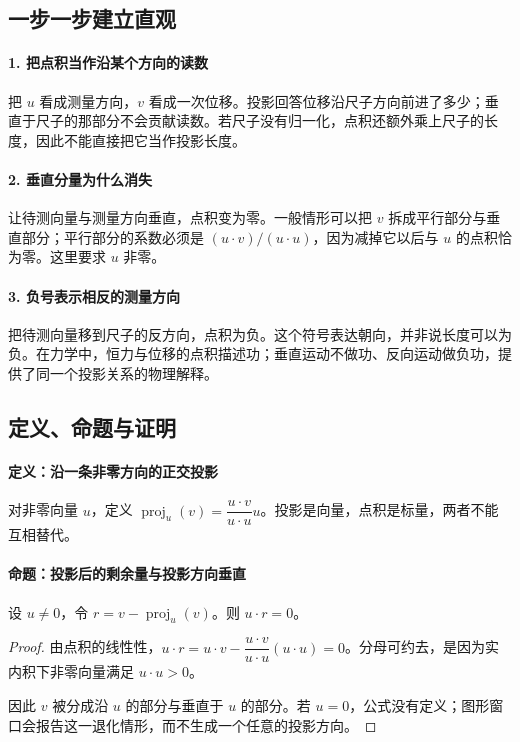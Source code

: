 \subsection*{一步一步建立直观}

\paragraph{1. 把点积当作沿某个方向的读数}

把 $u$ 看成测量方向，$v$ 看成一次位移。投影回答位移沿尺子方向前进了多少；垂直于尺子的那部分不会贡献读数。若尺子没有归一化，点积还额外乘上尺子的长度，因此不能直接把它当作投影长度。



\paragraph{2. 垂直分量为什么消失}

让待测向量与测量方向垂直，点积变为零。一般情形可以把 $v$ 拆成平行部分与垂直部分；平行部分的系数必须是 $(u\cdot v)/(u\cdot u)$，因为减掉它以后与 $u$ 的点积恰为零。这里要求 $u$ 非零。



\paragraph{3. 负号表示相反的测量方向}

把待测向量移到尺子的反方向，点积为负。这个符号表达朝向，并非说长度可以为负。在力学中，恒力与位移的点积描述功；垂直运动不做功、反向运动做负功，提供了同一个投影关系的物理解释。



\subsection*{定义、命题与证明}

\paragraph{定义：沿一条非零方向的正交投影}

对非零向量 $u$，定义 $\operatorname{proj}_u(v)=\dfrac{u\cdot v}{u\cdot u}u$。投影是向量，点积是标量，两者不能互相替代。

\paragraph{命题：投影后的剩余量与投影方向垂直}

设 $u\ne0$，令 $r=v-\operatorname{proj}_u(v)$。则 $u\cdot r=0$。

\begin{proof}

由点积的线性性，$u\cdot r=u\cdot v-\dfrac{u\cdot v}{u\cdot u}(u\cdot u)=0$。分母可约去，是因为实内积下非零向量满足 $u\cdot u>0$。

因此 $v$ 被分成沿 $u$ 的部分与垂直于 $u$ 的部分。若 $u=0$，公式没有定义；图形窗口会报告这一退化情形，而不生成一个任意的投影方向。

\end{proof}
